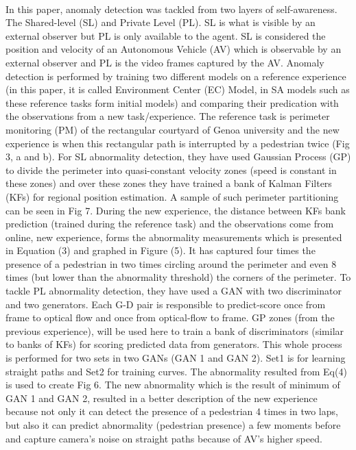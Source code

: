 \documentclass{article}
\begin{document}
			\paragraph{\cite{baydoun-2018-a-multi-perspective-approach-to-anomaly-detection-for-self-aware-embodied-agents}} In this paper, anomaly detection was tackled from two layers of self-awareness. The Shared-level (SL) and Private Level (PL). SL is what is visible by an external observer but PL is only available to the agent. SL is considered the position and velocity of an Autonomous Vehicle (AV) which is observable by an external observer and PL is the video frames captured by the AV. Anomaly detection is performed by training two different models on a reference experience (in this paper, it is called Environment Center (EC) Model, in SA models such as \cite{regazzoni-2020-multi-sensorial-generative-and-descriptive-self-awareness-models-for-autonomous-systems} these reference tasks form initial models) and comparing their predication with the observations from a new task/experience. The reference task is perimeter monitoring (PM) of the rectangular courtyard of Genoa university and the new experience is when this rectangular path is interrupted by a pedestrian twice (Fig 3, a and b). For SL abnormality detection, they have used Gaussian Process (GP) to divide the perimeter into quasi-constant velocity zones (speed is constant in these zones) and over these zones they have trained a bank of Kalman Filters (KFs) for regional position estimation. A sample of such perimeter partitioning can be seen in Fig 7. During the new experience, the distance between KFs bank prediction (trained during the reference task) and the observations come from online, new experience, forms the abnormality measurements which is presented in Equation (3) and graphed in Figure (5).  It has captured four times the presence of a pedestrian in two times circling around the perimeter and even 8 times (but lower than the abnormality threshold) the corners of the perimeter. To tackle PL abnormality detection, they have used a GAN with two discriminator and two generators. Each G-D pair is responsible to predict-score once from frame to optical flow and once from optical-flow to frame. GP zones (from the previous experience), will be used here to train a bank of discriminators (similar to banks of KFs) for scoring predicted data from generators. This whole process is performed for two sets in two GANs (GAN 1 and GAN 2). Set1 is for learning straight paths and Set2 for training curves. The abnormality resulted from Eq(4) is used to create Fig 6. The new abnormality which is the result of minimum of GAN 1 and GAN 2, resulted in a better description of the new experience because not only it can detect the presence of a pedestrian 4 times in two laps, but also it can predict abnormality (pedestrian presence) a few moments before and capture camera's noise on straight paths because of AV's higher speed.                                                
			
\end{document}

